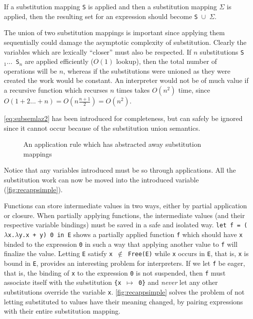 \documentclass[11pt,oneside,a4paper]{report}
\begin{document}
If a substitution mapping \texttt{S} is applied and then a substitution mapping $\Sigma$ is applied, then the resulting set for an expression should become \texttt{S $\cup$ $\Sigma$}.
\begin{remark}
  The union of two substitution mappings is important since applying them sequentially could damage the asymptotic complexity of substitution.
  Clearly the variables which are lexically ``closer'' must also be respected. %
  If $n$ substitutions \texttt{S$_1 \dots$ S$_n$} are applied efficiently ($O(1)$ lookup), then the total number of operations will be $n$, whereas if the substitutions were unioned as they were created the work would be constant.
  An interpreter would not be of much value if a recursive function which recurses $n$ times takes $O(n^2)$ time, since $O(1 + 2  \dots + n) = O(n \frac{n + 1}{2}) = O(n^2)$.
\end{remark}
\autoref{eq:subsemlaz2} has been introduced for completeness, but can safely be ignored since it cannot occur because of the substitution union semantics.
\begin{figure}[ht]
    \begin{mdframed}[style=style1]
        \vspace*{0.4cm}
          \begin{prooftree}
          \end{prooftree}   
    \end{mdframed}
    \caption{An application rule which has abstracted away substitution mappings}
    \label{fig:recappsimple}
\end{figure}
Notice that any variables introduced must be so through applications.
All the substitution work can now be moved into the introduced variable (\autoref{fig:recappsimple}).

Functions can store intermediate values in two ways, either by partial application or closure.
When partially applying functions, the intermediate values (and their respective variable bindings) must be saved in a safe and isolated way.
\texttt{let f = ($\lambda$x.$\lambda$y.x + y) 0 in E} shows a partially applied function \texttt{f} which should have \texttt{x} binded to the expression \texttt{0} in such a way that applying another value to \texttt{f} will finalize the value.
Letting \texttt{E} satisfy \texttt{x $\notin$ Free(E)} while \texttt{x} occurs in \texttt{E}, that is, \texttt{x} is bound in \texttt{E}, provides an interesting problem for interpreters.
If we let \texttt{f} be eager, that is, the binding of \texttt{x} to the expression \texttt{0} is not suspended, then \texttt{f} must associate itself with the substitution \texttt{\{x $\mapsto$ 0\}} and \textit{never} let any other substitutions override the variable \texttt{x}.
\autoref{fig:recappsimple} solves the problem of not letting substituted to values have their meaning changed, by pairing expressions with their entire substitution mapping.
\end{document}
